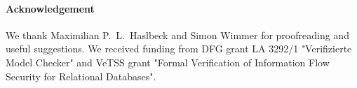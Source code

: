 \documentclass[a4paper,USenglish,cleveref, autoref]{lipics-v2019}
\begin{document}
% 
% 

{\footnotesize
\paragraph*{\footnotesize Acknowledgement}
We thank Maximilian P.\ L.\ Haslbeck and Simon Wimmer for proofreading and useful suggestions.
We received funding from DFG grant LA 3292/1 "Verifizierte Model Checker" and VeTSS grant "Formal Verification of Information Flow Security for Relational Databases".
}

\clearpage

% 
% 
% 
% 
% 
% 
  
  
  
% 
% 

% 

\end{document}
